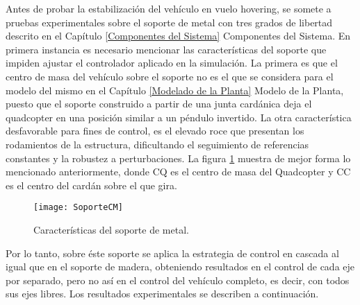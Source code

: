 \documentclass[\main/main.tex]{subfiles}
\begin{document}
Antes de probar la estabilización del vehículo en vuelo hovering,
se somete a pruebas experimentales sobre el soporte de metal con tres
grados de libertad descrito en el Capítulo \ref{Componentes del Sistema} Componentes del Sistema. En primera
instancia es necesario mencionar las características del soporte que
impiden ajustar el controlador aplicado en la simulación. La primera
es que el centro de masa del vehículo sobre el soporte no es el que
se considera para el modelo del mismo en el Capítulo \ref{Modelado de la Planta} Modelo de la Planta, puesto que
el soporte construido a partir de una junta cardánica deja el quadcopter
en una posición similar a un péndulo invertido. La otra característica
desfavorable para fines de control, es el elevado roce que presentan
los rodamientos de la estructura, dificultando el seguimiento de referencias
constantes y la robustez a perturbaciones. La figura \ref{fig:Carac_soport}\textbf{
} muestra de mejor forma lo mencionado anteriormente, donde CQ es el centro de masa del Quadcopter y CC es el centro del cardán sobre el que gira.

\begin{figure}[H]
\noindent \begin{centering}
\texttt{[image: SoporteCM]}
\par\end{centering}
\caption{Características del soporte de metal.\label{fig:Carac_soport}}
\end{figure}


Por lo tanto, sobre éste soporte se aplica la estrategia de control
en cascada al igual que en el soporte de madera, obteniendo resultados
en el control de cada eje por separado, pero no así en el control
del vehículo completo, es decir, con todos sus ejes libres. Los resultados
experimentales se describen a continuación.
\end{document}
